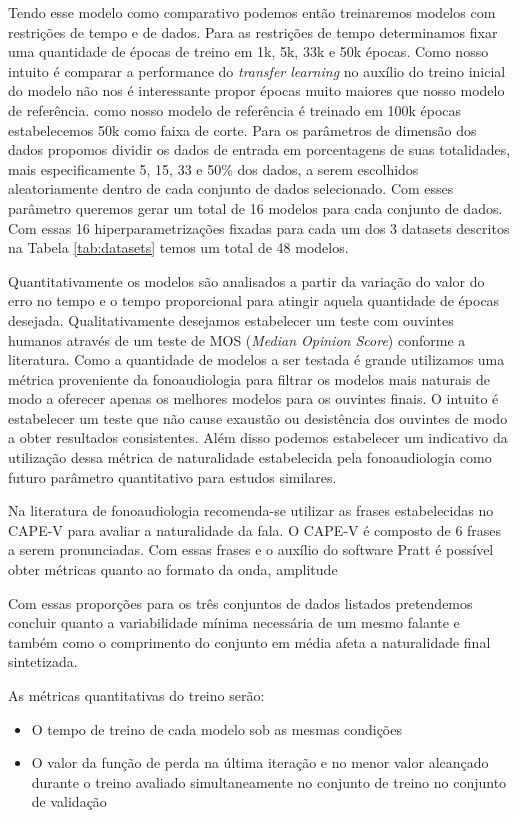 \documentclass{article}
\begin{document}
Tendo esse modelo como comparativo podemos então treinaremos modelos com restrições de tempo e de dados. Para as restrições de tempo determinamos fixar uma quantidade de épocas de treino em 1k, 5k, 33k e 50k épocas. Como nosso intuito é comparar a performance do \textit{transfer learning} no auxílio do treino inicial do modelo não nos é interessante propor épocas muito maiores que nosso modelo de referência. como nosso modelo de referência é treinado em 100k épocas estabelecemos 50k como faixa de corte. Para os parâmetros de dimensão dos dados propomos dividir os dados de entrada em porcentagens de suas totalidades, mais especificamente 5, 15, 33 e 50\% dos dados, a serem escolhidos aleatoriamente dentro de cada conjunto de dados selecionado. Com esses parâmetro queremos gerar um total de 16 modelos para cada conjunto de dados. Com essas 16 hiperparametrizações fixadas para cada um dos 3 datasets descritos na Tabela \ref{tab:datasets} temos um total de 48 modelos. 

Quantitativamente os modelos são analisados a partir da variação do valor do erro no tempo e o tempo proporcional para atingir aquela quantidade de épocas desejada. Qualitativamente desejamos estabelecer um teste com ouvintes humanos através de um teste de MOS (\textit{Median Opinion Score}) conforme a literatura. Como a quantidade de modelos a ser testada é grande utilizamos uma métrica proveniente da fonoaudiologia para filtrar os modelos mais naturais de modo a oferecer apenas os melhores modelos para os ouvintes finais. O intuito é estabelecer um teste que não cause exaustão ou desistência dos ouvintes de modo a obter resultados consistentes. Além disso podemos estabelecer um indicativo da utilização dessa métrica de naturalidade estabelecida pela fonoaudiologia como futuro parâmetro quantitativo para estudos similares.

Na literatura de fonoaudiologia recomenda-se utilizar as frases estabelecidas no CAPE-V para avaliar a naturalidade da fala. O CAPE-V é composto de 6 frases a serem pronunciadas. Com essas frases e o auxílio do software Pratt é possível obter métricas quanto ao formato da onda, amplitude 

Com essas proporções para os três conjuntos de dados listados pretendemos concluir  quanto a variabilidade mínima necessária de um mesmo falante e também como o comprimento do conjunto em média afeta a naturalidade final sintetizada.

As métricas quantitativas do treino serão:
\begin{itemize}
    \item O tempo de treino de cada modelo sob as mesmas condições
    \item O valor da função de perda na última iteração e no menor valor alcançado durante o treino avaliado simultaneamente no conjunto de treino no conjunto de validação
\end{itemize}
\end{document}
